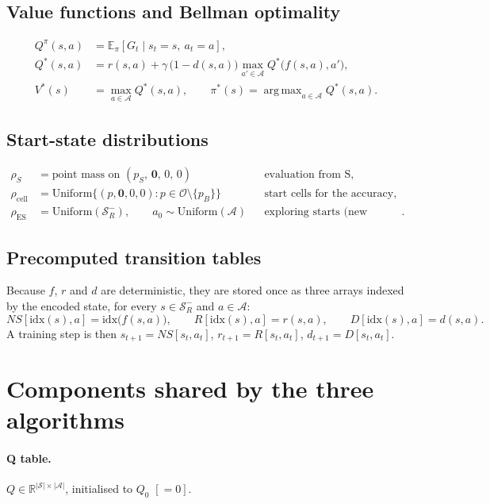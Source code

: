\documentclass[11pt]{article}
\newcommand{\Sset}{\mathcal{S}}
\newcommand{\Aset}{\mathcal{A}}
\newcommand{\Open}{\mathcal{O}}
\newcommand{\Qs}{Q^{*}}
\DeclareMathOperator*{\argmax}{arg\,max}
\begin{document}
\subsection{Value functions and Bellman optimality}
\begin{align}
Q^{\pi}(s,a) &= \mathbb{E}_{\pi}\left[G_t \mid s_t=s,\ a_t=a\right],\\
\Qs(s,a) &= r(s,a)+\gamma\,\big(1-d(s,a)\big)\max_{a'\in\Aset}\Qs\big(f(s,a),a'\big),\\
V^{*}(s) &= \max_{a\in\Aset}\Qs(s,a),\qquad \pi^{*}(s)=\argmax_{a\in\Aset}\Qs(s,a).
\end{align}

\subsection{Start-state distributions}\label{sec:start}
\begin{align}
\rho_{S} &= \text{point mass on } (p_S,\,\mathbf{0},\,0,\,0) && \text{evaluation from S},\\
\rho_{\mathrm{cell}} &= \mathrm{Uniform}\{(p,\mathbf{0},0,0): p\in\Open\setminus\{p_B\}\} && \text{start cells for the accuracy},\\
\rho_{\mathrm{ES}} &= \mathrm{Uniform}(\Sset_R^{-}),\qquad a_0\sim\mathrm{Uniform}(\Aset) && \text{exploring starts (new training start)}.
\end{align}

\subsection{Precomputed transition tables}
Because $f$, $r$ and $d$ are deterministic, they are stored once as three arrays indexed by the encoded state, for every $s\in\Sset_R^{-}$ and $a\in\Aset$:
\begin{equation}
NS[\mathrm{idx}(s),a]=\mathrm{idx}\big(f(s,a)\big),\qquad R[\mathrm{idx}(s),a]=r(s,a),\qquad D[\mathrm{idx}(s),a]=d(s,a).
\end{equation}
A training step is then $s_{t+1}=NS[s_t,a_t]$, $r_{t+1}=R[s_t,a_t]$, $d_{t+1}=D[s_t,a_t]$.

\section{Components shared by the three algorithms}
\paragraph{Q table.} $Q\in\mathbb{R}^{|\Sset|\times|\Aset|}$, initialised to $Q_0$ $[=0]$.
\end{document}
